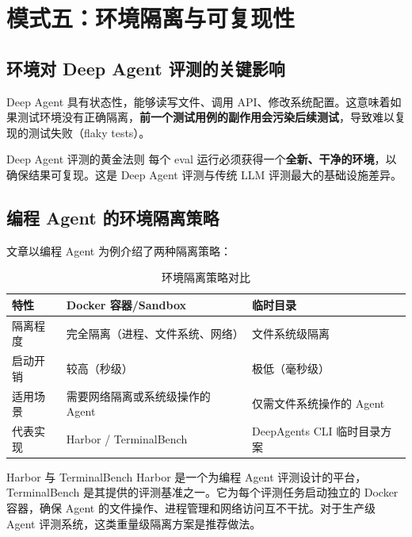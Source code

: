 \section{模式五：环境隔离与可复现性}

\subsection{环境对 Deep Agent 评测的关键影响}

Deep Agent 具有状态性，能够读写文件、调用 API、修改系统配置。这意味着如果测试环境没有正确隔离，\textbf{前一个测试用例的副作用会污染后续测试}，导致难以复现的测试失败（flaky tests）。

\begin{importantbox}{Deep Agent 评测的黄金法则}
每个 eval 运行必须获得一个\textbf{全新、干净的环境}，以确保结果可复现。这是 Deep Agent 评测与传统 LLM 评测最大的基础设施差异。
\end{importantbox}

\subsection{编程 Agent 的环境隔离策略}

文章以编程 Agent 为例介绍了两种隔离策略：

\begin{table}[H]
\centering
\caption{环境隔离策略对比}
\begin{tabular}{lp{4.5cm}p{4.5cm}}
\toprule
\textbf{特性} & \textbf{Docker 容器/Sandbox} & \textbf{临时目录} \\
\midrule
隔离程度 & 完全隔离（进程、文件系统、网络） & 文件系统级隔离 \\
启动开销 & 较高（秒级） & 极低（毫秒级） \\
适用场景 & 需要网络隔离或系统级操作的 Agent & 仅需文件系统操作的 Agent \\
代表实现 & Harbor / TerminalBench & DeepAgents CLI 临时目录方案 \\
\bottomrule
\end{tabular}
\end{table}

\begin{knowledgebox}{Harbor 与 TerminalBench}
Harbor 是一个为编程 Agent 评测设计的平台，TerminalBench 是其提供的评测基准之一。它为每个评测任务启动独立的 Docker 容器，确保 Agent 的文件操作、进程管理和网络访问互不干扰。对于生产级 Agent 评测系统，这类重量级隔离方案是推荐做法。
\end{knowledgebox}


